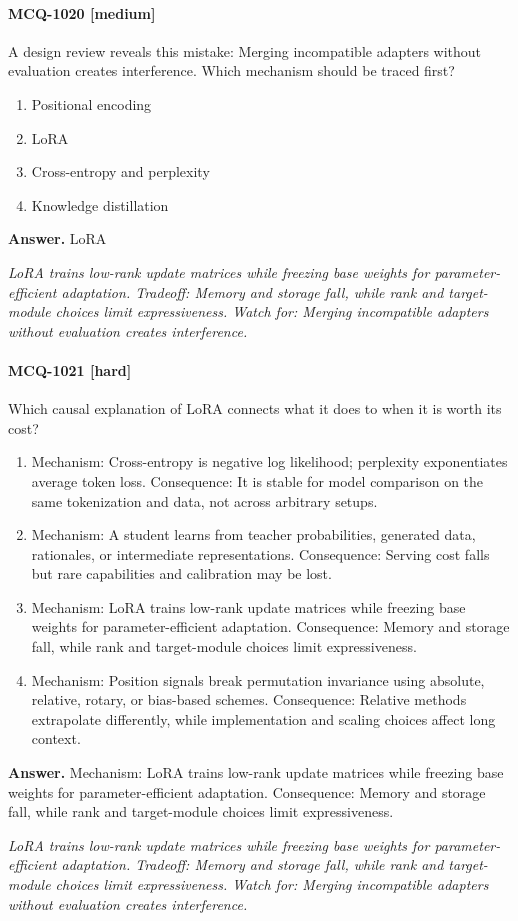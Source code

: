 \paragraph{MCQ-1020 [medium]} A design review reveals this mistake: Merging incompatible adapters without evaluation creates interference. Which mechanism should be traced first?
\begin{enumerate}[label=\Alph*.]
\item Positional encoding
\item LoRA
\item Cross-entropy and perplexity
\item Knowledge distillation
\end{enumerate}
\noindent\textbf{Answer.} LoRA
\par\textit{LoRA trains low-rank update matrices while freezing base weights for parameter-efficient adaptation. Tradeoff: Memory and storage fall, while rank and target-module choices limit expressiveness. Watch for: Merging incompatible adapters without evaluation creates interference.}
\paragraph{MCQ-1021 [hard]} Which causal explanation of LoRA connects what it does to when it is worth its cost?
\begin{enumerate}[label=\Alph*.]
\item Mechanism: Cross-entropy is negative log likelihood; perplexity exponentiates average token loss. Consequence: It is stable for model comparison on the same tokenization and data, not across arbitrary setups.
\item Mechanism: A student learns from teacher probabilities, generated data, rationales, or intermediate representations. Consequence: Serving cost falls but rare capabilities and calibration may be lost.
\item Mechanism: LoRA trains low-rank update matrices while freezing base weights for parameter-efficient adaptation. Consequence: Memory and storage fall, while rank and target-module choices limit expressiveness.
\item Mechanism: Position signals break permutation invariance using absolute, relative, rotary, or bias-based schemes. Consequence: Relative methods extrapolate differently, while implementation and scaling choices affect long context.
\end{enumerate}
\noindent\textbf{Answer.} Mechanism: LoRA trains low-rank update matrices while freezing base weights for parameter-efficient adaptation. Consequence: Memory and storage fall, while rank and target-module choices limit expressiveness.
\par\textit{LoRA trains low-rank update matrices while freezing base weights for parameter-efficient adaptation. Tradeoff: Memory and storage fall, while rank and target-module choices limit expressiveness. Watch for: Merging incompatible adapters without evaluation creates interference.}
